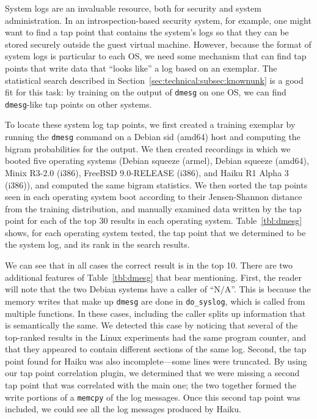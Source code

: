 System logs are an invaluable resource, both for security and system
administration. In an introspection-based security system, for example,
one might want to find a tap point that contains the system's logs so
that they can be stored securely outside the guest virtual machine.
However, because the format of system logs is particular to each OS, we
need some mechanism that can find tap points that write data that
``looks like'' a log based on an exemplar. The statistical search
described in Section~\ref{sec:technical:subsec:knownunk} is a good fit
for this task: by training on the output of \texttt{dmesg} on one
OS, we can find \texttt{dmesg}-like tap points on other systems.

To locate these system log tap points, we first created a training
exemplar by running the \texttt{dmesg} command on a Debian sid (amd64)
host and computing the bigram probabilities for the output. We then
created recordings in which we booted five operating systems (Debian
squeeze (armel), Debian squeeze (amd64), Minix R3-2.0 (i386), FreeBSD
9.0-RELEASE (i386), and Haiku R1 Alpha 3 (i386)), and computed the same
bigram statistics. We then sorted the tap points seen in each operating
system boot according to their Jensen-Shannon distance from the training
distribution, and manually examined data written by the tap point for
each of the top 30 results in each operating system.
Table~\ref{tbl:dmesg} shows, for each operating system tested, the tap
point that we determined to be the system log, and its rank in the
search results.

We can see that in all cases the correct result is in the top 10. There
are two additional features of Table~\ref{tbl:dmesg} that bear
mentioning. First, the reader will note that the two Debian systems have
a caller of ``N/A''. This is because the memory writes that make up
\texttt{dmesg} are done in \texttt{do\_syslog}, which is called from
multiple functions. In these cases, including the caller splits up
information that is semantically the same. We detected this case by
noticing that several of the top-ranked results in the Linux experiments
had the same program counter, and that they appeared to contain
different sections of the same log. Second, the tap point found for
Haiku was also incomplete---some lines were truncated. By using our tap
point correlation plugin, we determined that we were missing a second
tap point that was correlated with the main one; the two together formed
the write portions of a \texttt{memcpy} of the log messages. Once this
second tap point was included, we could see all the log messages
produced by Haiku.

